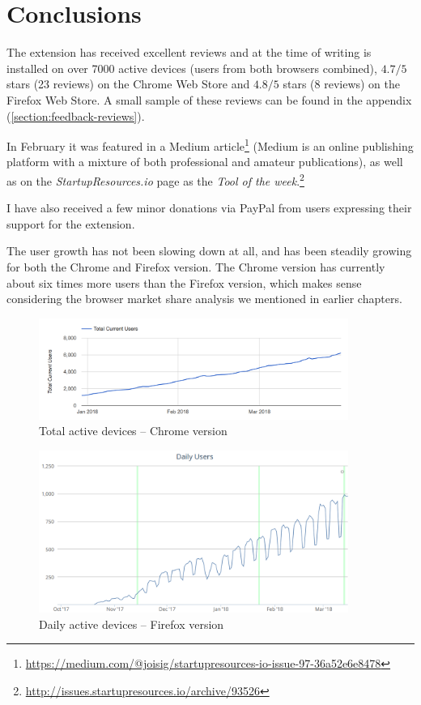 \documentclass[bsc,frontabs,twoside,singlespacing,parskip,deptreport]{infthesis}
\begin{document}
\chapter{Conclusions}
\label{chapter:conclusions}

The extension has received excellent reviews and at the time of writing is installed on over 7000 active devices (users from both browsers combined), $4.7/5$ stars (23 reviews) on the Chrome Web Store and $4.8/5$ stars (8 reviews) on the Firefox Web Store. A small sample of these reviews can be found in the appendix (\autoref{section:feedback-reviews}).

In February it was featured in a Medium article\footnote{\url{https://medium.com/@joisig/startupresources-io-issue-97-36a52e6e8478}} (Medium is an online publishing platform with a mixture of both professional and amateur publications), as well as on the \textit{StartupResources.io} page as the \textit{Tool of the week}.\footnote{\url{http://issues.startupresources.io/archive/93526}}

I have also received a few minor donations via PayPal from users expressing their support for the extension.

The user growth has not been slowing down at all, and has been steadily growing for both the Chrome and Firefox version. The Chrome version has currently about six times more users than the Firefox version, which makes sense considering the browser market share analysis we mentioned in earlier chapters.

\begin{figure}[h]
\centering
\includegraphics[width=0.9\textwidth]{../docs/chrome-version-users.png}
\caption{Total active devices -- Chrome version}
\end{figure}

\begin{figure}[h]
\centering
\includegraphics[width=0.9\textwidth]{../docs/firefox-version-users.png}
\caption{Daily active devices -- Firefox version}
\end{figure}
\end{document}
